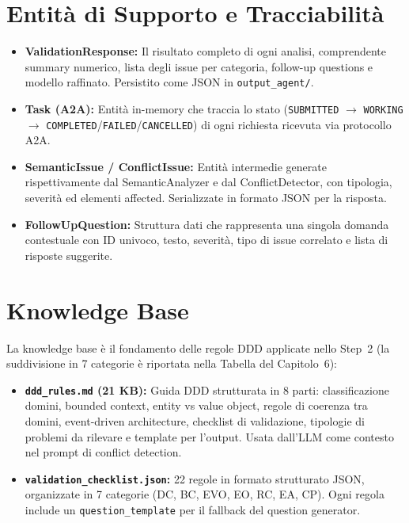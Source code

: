 \documentclass[12pt,a4paper]{report}
\begin{document}
\section{Entità di Supporto e Tracciabilità}

\begin{itemize}
  \item \textbf{ValidationResponse:} Il risultato completo di ogni analisi,
        comprendente summary numerico, lista degli issue per categoria,
        follow-up questions e modello raffinato. Persistito come JSON
        in \texttt{output\_agent/}.

  \item \textbf{Task (A2A):} Entità in-memory che traccia lo stato
        (\texttt{SUBMITTED} $\rightarrow$ \texttt{WORKING} $\rightarrow$
        \texttt{COMPLETED}/\texttt{FAILED}/\texttt{CANCELLED}) di ogni
        richiesta ricevuta via protocollo A2A.

  \item \textbf{SemanticIssue / ConflictIssue:} Entità intermedie generate
        rispettivamente dal SemanticAnalyzer e
        dal ConflictDetector, con tipologia, severità ed
        elementi affected. Serializzate in formato JSON per la risposta.

  \item \textbf{FollowUpQuestion:} Struttura dati che rappresenta una singola
        domanda contestuale con ID univoco, testo, severità, tipo di issue
        correlato e lista di risposte suggerite.
\end{itemize}

\section{Knowledge Base}

La knowledge base è il fondamento delle regole DDD applicate nello Step~2
(la suddivisione in 7 categorie è riportata nella Tabella del Capitolo~6):

\begin{itemize}
  \item \textbf{\texttt{ddd\_rules.md} (21 KB):} Guida DDD strutturata in
        8 parti: classificazione domini, bounded context, entity vs value object,
        regole di coerenza tra domini, event-driven architecture, checklist di
        validazione, tipologie di problemi da rilevare e template per l'output.
        Usata dall'LLM come contesto nel prompt di conflict detection.

  \item \textbf{\texttt{validation\_checklist.json}:} 22 regole in formato
        strutturato JSON, organizzate in 7 categorie (DC, BC, EVO, EO, RC, EA, CP).
        Ogni regola include un \texttt{question\_template} per il fallback del
        question generator.
\end{itemize}
\end{document}
